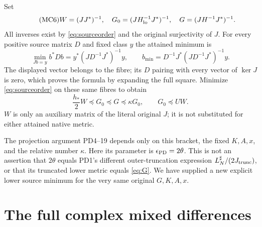 \documentclass[11pt]{article}
\begin{document}
Set
\begin{equation}\tag{MC6}\label{eq:G}
 W=(JJ^*)^{-1},\quad
 G_0=(JH_{\rm lo}^{-1}J^*)^{-1},\quad
 G=(JH^{-1}J^*)^{-1}.
\end{equation}
All inverses exist by \eqref{eq:sourceorder} and the original
surjectivity of $J$. For every positive source matrix $D$ and
fixed class $y$ the attained minimum is
\[
 \min_{Jb=y}b^*Db=y^*(JD^{-1}J^*)^{-1}y,
 \qquad b_{\min}=D^{-1}J^*(JD^{-1}J^*)^{-1}y.
\]
The displayed vector belongs to the fibre; its $D$ pairing with
every vector of $\ker J$ is zero, which proves the formula by
expanding the full square. Minimize \eqref{eq:sourceorder} on
these same fibres to obtain
\begin{equation}\tag{MC7}\label{eq:classorder}
 \boxed{\frac{h_*}{2}W\preceq G_0\preceq G\preceq\kappa G_0,
                    \qquad G_0\preceq UW.}
\end{equation}
$W$ is only an auxiliary matrix of the literal original $J$;
it is not substituted for either attained native metric.

The projection argument PD4--19 depends only on this bracket,
the fixed $K,A,x$, and the relative number $\kappa$. Here its
parameter is $\epsilon_{\rm PD}=2\theta$. This is not an
assertion that $2\theta$ equals PD1's different outer-truncation
expression $L_N^\sharp/(2J_{\rm trunc})$, or that its truncated
lower metric equals \eqref{eq:G}. We have supplied a new explicit
lower source minimum for the very same original $G,K,A,x$.

\section{The full complex mixed differences}
\end{document}
